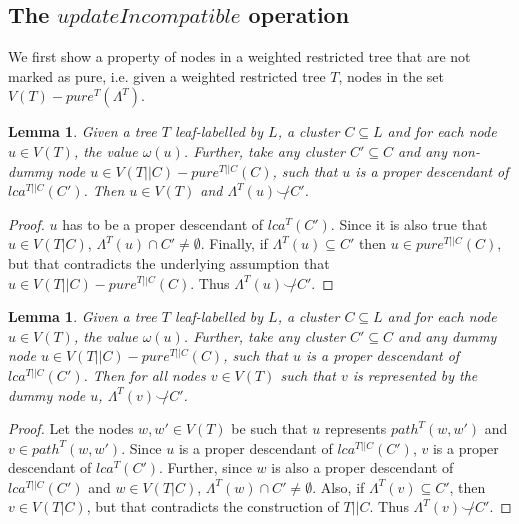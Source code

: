 \documentclass[final,1p,times]{elsarticle}
\newcommand{\compatible}{\smile}
\newcommand{\leafset}{\Lambda}
\newcommand{\weight}{\omega}
\newtheorem{lemma}[theorem]{Lemma}
\begin{document}
    \subsection{The $updateIncompatible$ operation}
    \label{subsec:updateincompatible}

    We first show a property of nodes in a weighted restricted tree that are not marked as pure, i.e. given a weighted restricted tree $T$, nodes in the set $V(T) - pure^{T}(\leafset^{T})$.
    \newline

    \begin{lemma}
        \label{lem:impurenodesincompatiblenondummy}
        Given a tree $T$ leaf-labelled by $L$, a cluster $C \subseteq L$ and for each node $u \in V(T)$, the value $\weight(u)$. Further, take any cluster $C' \subseteq C$ and any non-dummy node $u \in V(T||C) - pure^{T||C}(C)$, such that $u$ is a proper descendant of $lca^{T||C}(C')$. Then $u \in V(T)$ and $\leafset^{T}(u) \not\compatible C'$.
    \end{lemma}
        \begin{proof}
            $u$ has to be a proper descendant of $lca^{T}(C')$. Since it is also true that $u \in V(T|C)$, $\leafset^{T}(u) \cap C' \neq \emptyset$. Finally, if $\leafset^{T}(u) \subseteq C'$ then $u \in pure^{T||C}(C)$, but that contradicts the underlying assumption that $u \in V(T||C) - pure^{T||C}(C)$. Thus $\leafset^{T}(u) \not\compatible C'$.
        \end{proof}

    \medskip
    \begin{lemma}
        \label{lem:impurenodesincompatibledummy}
        Given a tree $T$ leaf-labelled by $L$, a cluster $C \subseteq L$ and for each node $u \in V(T)$, the value $\weight(u)$. Further, take any cluster $C' \subseteq C$ and any dummy node $u \in V(T||C) - pure^{T||C}(C)$, such that $u$ is a proper descendant of $lca^{T||C}(C')$. Then for all nodes $v \in V(T)$ such that $v$ is represented by the dummy node $u$, $\leafset^{T}(v) \not\compatible C'$.
    \end{lemma}
        \begin{proof}
                Let the nodes $w, w' \in V(T)$ be such that $u$ represents $path^{T}(w, w')$ and $v \in path^{T}(w, w')$. Since $u$ is a proper descendant of $lca^{T||C}(C')$, $v$ is a proper descendant of $lca^{T}(C')$. Further, since $w$ is also a proper descendant of $lca^{T||C}(C')$ and $w \in V(T|C)$, $\leafset^{T}(w) \cap C' \neq \emptyset$. Also, if $\leafset^{T}(v) \subseteq C'$, then $v \in V(T|C)$, but that contradicts the construction of $T||C$. Thus $\leafset^{T}(v) \not\compatible C'$.
        \end{proof}
\end{document}

